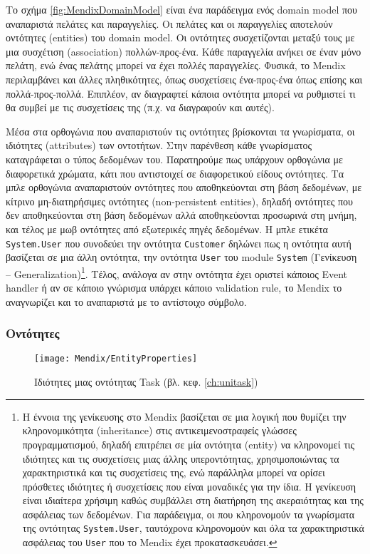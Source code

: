             Το σχήμα \ref{fig:MendixDomainModel} είναι ένα παράδειγμα ενός domain model που αναπαριστά πελάτες και παραγγελίες. Οι πελάτες και οι παραγγελίες αποτελούν οντότητες (entities) του domain model. Οι οντότητες συσχετίζονται μεταξύ τους με μια συσχέτιση (association) πολλών-προς-ένα. Κάθε παραγγελία ανήκει σε έναν μόνο πελάτη, ενώ ένας πελάτης μπορεί να έχει πολλές παραγγελίες. Φυσικά, το Mendix περιλαμβάνει και άλλες πληθικότητες, όπως συσχετίσεις ένα-προς-ένα όπως επίσης και πολλά-προς-πολλά. Επιπλέον, αν διαγραφτεί κάποια οντότητα μπορεί να ρυθμιστεί τι θα συμβεί με τις συσχετίσεις της (π.χ. να διαγραφούν και αυτές).

            Μέσα στα ορθογώνια που αναπαριστούν τις οντότητες βρίσκονται τα γνωρίσματα, οι ιδιότητες (attributes) των οντοτήτων. Στην παρένθεση κάθε γνωρίσματος καταγράφεται ο τύπος δεδομένων του. Παρατηρούμε πως υπάρχουν ορθογώνια με διαφορετικά χρώματα, κάτι που αντιστοιχεί σε διαφορετικού είδους οντότητες. Τα μπλε ορθογώνια αναπαριστούν οντότητες που αποθηκεύονται στη βάση δεδομένων, με κίτρινο μη-διατηρήσιμες οντότητες (non-persistent entities), δηλαδή οντότητες που δεν αποθηκεύονται στη βάση δεδομένων αλλά αποθηκεύονται προσωρινά στη μνήμη, και τέλος με μωβ οντότητες από εξωτερικές πηγές δεδομένων. Η μπλε ετικέτα \texttt{System.User} που συνοδεύει την οντότητα \texttt{Customer} δηλώνει πως η οντότητα αυτή βασίζεται σε μια άλλη οντότητα, την οντότητα \texttt{User} του module \texttt{System} (Γενίκευση -- Generalization)\footnote{Η έννοια της γενίκευσης στο Mendix βασίζεται σε μια λογική που θυμίζει την κληρονομικότητα (inheritance) στις αντικειμενοστραφείς γλώσσες προγραμματισμού, δηλαδή επιτρέπει σε μία οντότητα (entity) να κληρονομεί τις ιδιότητες και τις συσχετίσεις μιας άλλης υπεροντότητας, χρησιμοποιώντας τα χαρακτηριστικά και τις συσχετίσεις της, ενώ παράλληλα μπορεί να ορίσει πρόσθετες ιδιότητες ή συσχετίσεις που είναι μοναδικές για την ίδια. Η γενίκευση είναι ιδιαίτερα χρήσιμη καθώς συμβάλλει στη διατήρηση της ακεραιότητας και της ασφάλειας των δεδομένων. Για παράδειγμα, οι  που κληρονομούν τα γνωρίσματα της οντότητας \texttt{System.User}, ταυτόχρονα κληρονομούν και όλα τα χαρακτηριστικά ασφάλειας του \texttt{User} που το Mendix έχει προκατασκευάσει.}. Τέλος, ανάλογα αν στην οντότητα έχει οριστεί κάποιος Event handler ή αν σε κάποιο γνώρισμα υπάρχει κάποιο validation rule, το Mendix το αναγνωρίζει και το αναπαριστά με το αντίστοιχο σύμβολο.

            \subsubsection{Οντότητες}
                \begin{figure}[h!] \noindent \centering
                    \texttt{[image: Mendix/EntityProperties]}
                    \caption{\centering Ιδιότητες μιας οντότητας Task (βλ. κεφ. \ref{ch:unitask})}
                    \label{fig:MendixEntityProperties}
                \end{figure}

